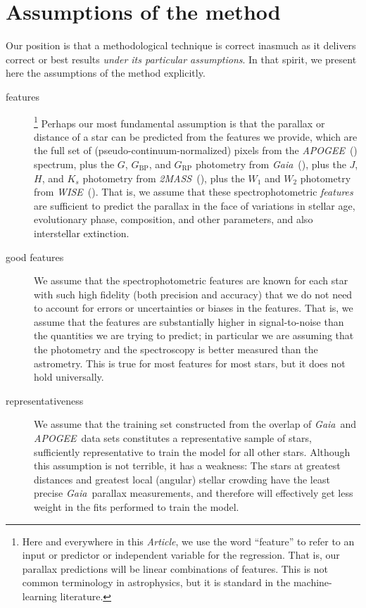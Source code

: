 \documentclass[modern]{aastex62}
\newcommand{\documentname}{\textsl{Article}}
\newcommand{\acronym}[1]{{\small{#1}}}
\newcommand{\project}[1]{\textsl{#1}}
\newcommand{\apogee}{\project{\acronym{APOGEE}}}
\newcommand{\gaia}{\project{Gaia}}
\newcommand{\wise}{\project{\acronym{WISE}}}
\newcommand{\zmass}{\project{\acronym{2MASS}}}
\newcommand{\BP}{{G_\mathrm{BP}}}
\newcommand{\RP}{{G_\mathrm{RP}}}
\begin{document}
\section{Assumptions of the method}\label{sec:assumptions}

Our position is that a methodological technique is correct inasmuch as
it delivers correct or best results \emph{under its particular assumptions}.
In that spirit, we present here the assumptions of the method
explicitly.
\begin{description}
\item[features]\footnote{Here and everywhere in this \documentname, we
  use the word ``feature'' to refer to an input or predictor or
  independent variable for the regression.
  That is, our parallax predictions will be linear combinations of features.
  This is not common terminology in astrophysics, but it is standard in the machine-learning literature.}
Perhaps our most fundamental assumption is that the parallax or distance
of a star can be predicted from the features we provide, which are
the full set of (pseudo-continuum-normalized) pixels from the \apogee\ (\citealt{apogee}) spectrum,
plus the $G$, $\BP$, and $\RP$ photometry from \gaia\ (\citealt{gaia}),
plus the $J$, $H$, and $K_s$ photometry from \zmass\ (\citealt{zmass}),
plus the $W_1$ and $W_2$ photometry from \wise\ (\citealt{wise}).
That is, we assume that these spectrophotometric \emph{features} are sufficient
to predict the parallax in the face of variations in stellar
age, evolutionary phase, composition, and other parameters, and also interstellar
extinction.

\item[good features] We assume that the spectrophotometric features are known for
each star with such high fidelity (both precision and accuracy) that we do not
need to account for errors or uncertainties or biases in the features.
That is, we assume that the features are substantially higher in signal-to-noise than the
quantities we are trying to predict; in particular we are assuming that the photometry
and the spectroscopy is better measured than the astrometry.
This is true for most features for most stars, but it does not hold universally.

\item[representativeness] We assume that the training set constructed from the overlap
of \gaia\ and \apogee\ data sets constitutes a representative sample of stars,
sufficiently representative to train the model for all other stars.
Although this assumption is not terrible, it has a weakness:
The stars at greatest distances and greatest local (angular) stellar crowding have
the least precise \gaia\ parallax measurements, and therefore will effectively get
less weight in the fits performed to train the model.


\end{description}
\end{document}
